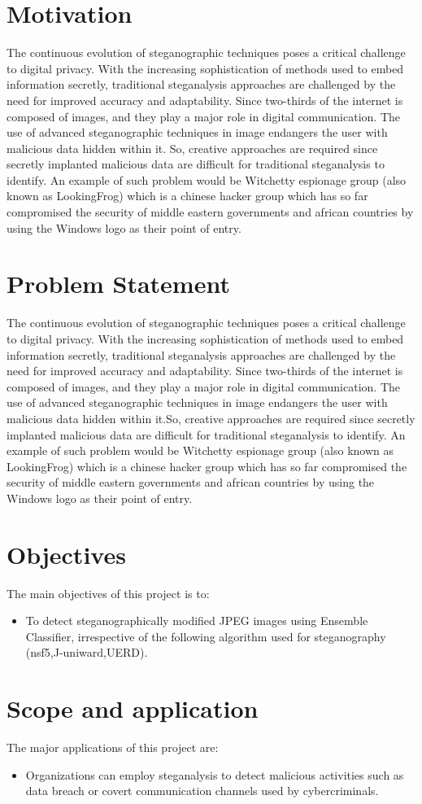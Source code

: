 \section{Motivation}
The continuous evolution of steganographic techniques poses a critical challenge to digital privacy. With the increasing sophistication of methods used to embed information secretly, traditional steganalysis approaches are challenged by the need for improved accuracy and adaptability. Since two-thirds of the internet is composed of images, and they play a major role in digital communication. The use of advanced steganographic techniques in image endangers the user with malicious data hidden within it. So, creative approaches are required since secretly implanted malicious data are difficult for traditional steganalysis to identify. An example of such problem would be Witchetty espionage group (also known as LookingFrog) which is a chinese hacker group which has so far compromised the security of middle eastern governments and african countries by using the Windows logo as their point of entry.\\

\section{Problem Statement} 
The continuous evolution of steganographic techniques poses a critical challenge to digital privacy. With the increasing sophistication of methods used to embed information secretly, traditional steganalysis approaches are challenged by the need for improved accuracy and adaptability. Since two-thirds of the internet is composed of images, and they play a major role in digital communication. The use of advanced steganographic techniques in image endangers the user with malicious data hidden within it.So, creative approaches are required since secretly implanted malicious data are difficult for traditional steganalysis to identify. An example of such problem would be Witchetty espionage group (also known as LookingFrog) which is a chinese hacker group which has so far compromised the security of middle eastern governments and african countries by using the Windows logo as their point of entry.\\
\clearpage

\section{Objectives}
The main objectives of this project is to:
\begin{itemize}
\item  To detect steganographically modified JPEG images using Ensemble \mbox{Classifier}, irrespective of the following algorithm used for steganography (nsf5,J-uniward,UERD). 
\end{itemize}
\section{Scope and application}
The major applications of this project are:
\begin{itemize}
    \item Organizations can employ steganalysis to detect malicious activities such as data breach or covert communication channels used by cybercriminals.
\end{itemize}

